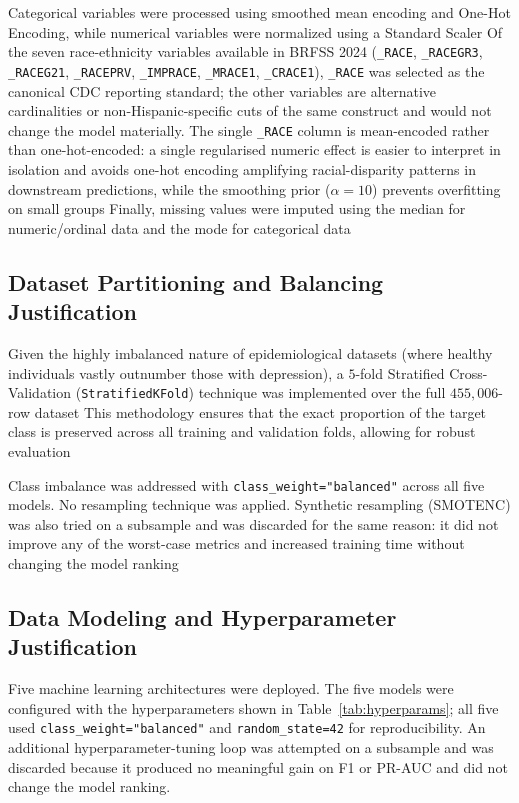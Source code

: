 \documentclass[conference]{IEEEtran}
\begin{document}
Categorical variables were processed using smoothed mean encoding and One-Hot Encoding, while numerical variables were normalized using a Standard Scaler %
Of the seven race-ethnicity variables available in BRFSS 2024 (\texttt{\_RACE}, \texttt{\_RACEGR3}, \texttt{\_RACEG21}, \texttt{\_RACEPRV}, \texttt{\_IMPRACE}, \texttt{\_MRACE1}, \texttt{\_CRACE1}), \texttt{\_RACE} was selected as the canonical CDC reporting standard; the other variables are alternative cardinalities or non-Hispanic-specific cuts of the same construct and would not change the model materially. The single \texttt{\_RACE} column is mean-encoded rather than one-hot-encoded: a single regularised numeric effect is easier to interpret in isolation and avoids one-hot encoding amplifying racial-disparity patterns in downstream predictions, while the smoothing prior ($\alpha=10$) prevents overfitting on small groups %
Finally, missing values were imputed using the median for numeric/ordinal data and the mode for categorical data %

\subsection{Dataset Partitioning and Balancing Justification}
Given the highly imbalanced nature of epidemiological datasets (where healthy individuals vastly outnumber those with depression), a $5$-fold Stratified Cross-Validation (\texttt{StratifiedKFold}) technique was implemented over the full $455{,}006$-row dataset %
This methodology ensures that the exact proportion of the target class is preserved across all training and validation folds, allowing for robust evaluation %

Class imbalance was addressed with \texttt{class\_weight="balanced"} across all five models. No resampling technique was applied. Synthetic resampling (SMOTENC) was also tried on a subsample and was discarded for the same reason: it did not improve any of the worst-case metrics and increased training time without changing the model ranking %

\subsection{Data Modeling and Hyperparameter Justification}
Five machine learning architectures were deployed. The five models were configured with the hyperparameters shown in Table~\ref{tab:hyperparams}; all five used \texttt{class\_weight="balanced"} and \texttt{random\_state=42} for reproducibility. An additional hyperparameter-tuning loop was attempted on a subsample and was discarded because it produced no meaningful gain on F1 or PR-AUC and did not change the model ranking.
\end{document}
